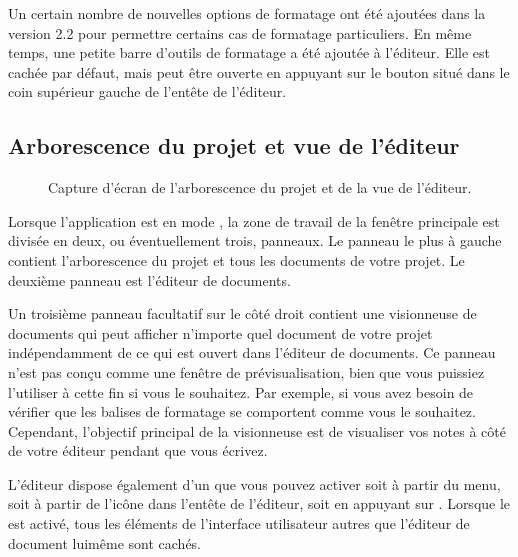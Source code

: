 \documentclass[a4paper,11pt,french]{sphinxmanual}
\begin{document}
\sphinxAtStartPar
{}Un certain nombre de nouvelles options de formatage ont été ajoutées dans la version 2.2 pour permettre certains cas de formatage particuliers. En même temps, une petite barre d’outils de formatage a été ajoutée à l’éditeur. Elle est cachée par défaut, mais peut être ouverte en appuyant sur le bouton situé dans le coin supérieur gauche de l’en\sphinxhyphen{}tête de l’éditeur.


\subsection{Arborescence du projet et vue de l’éditeur}
\label{\detokenize{usage_breakdown:project-tree-and-editor-view}}
\begin{figure}[htbp]
\centering
\capstart

\noindent{}
\caption{Capture d’écran de l’arborescence du projet et de la vue de l’éditeur.}\label{\detokenize{usage_breakdown:id1}}\end{figure}

\sphinxAtStartPar
Lorsque l’application est en mode , la zone de travail de la fenêtre principale est divisée en deux, ou éventuellement trois, panneaux. Le panneau le plus à gauche contient l’arborescence du projet et tous les documents de votre projet. Le deuxième panneau est l’éditeur de documents.

\sphinxAtStartPar
Un troisième panneau facultatif sur le côté droit contient une visionneuse de documents qui peut afficher n’importe quel document de votre projet indépendamment de ce qui est ouvert dans l’éditeur de documents. Ce panneau n’est pas conçu comme une fenêtre de prévisualisation, bien que vous puissiez l’utiliser à cette fin si vous le souhaitez. Par exemple, si vous avez besoin de vérifier que les balises de formatage se comportent comme vous le souhaitez. Cependant, l’objectif principal de la visionneuse est de visualiser vos notes à côté de votre éditeur pendant que vous écrivez.

\sphinxAtStartPar
L’éditeur dispose également d’un  que vous pouvez activer soit à partir du menu, soit à partir de l’icône dans l’en\sphinxhyphen{}tête de l’éditeur, soit en appuyant sur . Lorsque le  est activé, tous les éléments de l’interface utilisateur autres que l’éditeur de document lui\sphinxhyphen{}même sont cachés.
\end{document}
